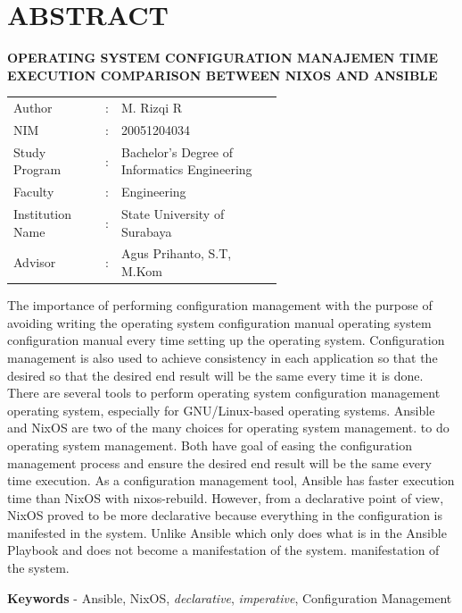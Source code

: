 \documentclass[10pt,]{report}
\begin{document}
\chapter*{ABSTRACT}
\begin{adjustwidth}{0.0cm}{}
	\begin{center}
		\textbf{OPERATING SYSTEM CONFIGURATION MANAJEMEN TIME EXECUTION COMPARISON BETWEEN NIXOS AND ANSIBLE}
	\end{center}
	\medskip
	\begin{adjustwidth}{0.0cm}{}
		\begin{tabular}{@{}lcp{0.6\linewidth}}
			Author           & : & M. Rizqi R                                   \\
			NIM              & : & 20051204034                                  \\
			Study Program    & : & Bachelor's Degree of Informatics Engineering \\
			Faculty          & : & Engineering                                  \\
			Institution Name & : & State University of Surabaya                 \\
			Advisor          & : & Agus Prihanto, S.T, M.Kom                    \\
		\end{tabular}
	\end{adjustwidth}
	\medskip

	The importance of performing configuration management with the purpose of
	avoiding writing the operating system configuration manual operating system
	configuration manual every time setting up the operating system.
	Configuration management is also used to achieve consistency in each
	application so that the desired so that the desired end result will be the
	same every time it is done. There are several tools to perform operating
	system configuration management operating system, especially for
	GNU/Linux-based operating systems. Ansible and NixOS are two of the many
	choices for operating system management. to do operating system management.
	Both have goal of easing the configuration management process and ensure the
	desired end result will be the same every time execution. As a configuration
	management tool, Ansible has faster execution time than NixOS with
	nixos-rebuild. However, from a declarative point of view, NixOS proved to be
	more declarative because everything in the configuration is manifested in the
	system. Unlike Ansible which only does what is in the Ansible Playbook and
	does not become a manifestation of the system. manifestation of the system.

	\medskip

	\noindent\textbf{Keywords} - Ansible, NixOS, \textit{declarative}, \textit{imperative},
	Configuration Management
\end{adjustwidth}
\tableofcontents
\newpage
\listoftables
\newpage
\listoffigures
\end{document}
